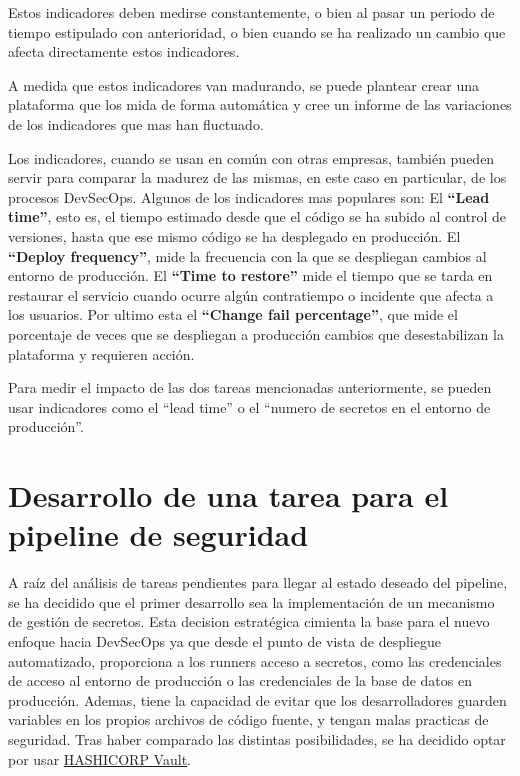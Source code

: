 \documentclass[12pt]{report} %
\begin{document}
Estos indicadores deben medirse constantemente, o bien al pasar un periodo de
tiempo estipulado con anterioridad, o bien cuando se ha realizado un cambio que
afecta directamente estos indicadores.

A medida que estos indicadores van madurando, se puede plantear crear una
plataforma que los mida de forma automática y cree un informe de las variaciones
de los indicadores que mas han fluctuado.

Los indicadores, cuando se usan en común con otras empresas, también pueden
servir para comparar la madurez de las mismas, en este caso en particular, de
los procesos \gls{DevSecOps}.
Algunos de los indicadores mas populares son:
El \textbf{``Lead time''}, esto es, el tiempo estimado desde que el código se ha subido
al control de versiones, hasta que ese mismo código se ha desplegado en
producción.
El \textbf{``Deploy frequency''}, mide la frecuencia con la que se despliegan
cambios al entorno de producción.
El \textbf{``Time to restore''} mide el tiempo que se tarda en restaurar el
servicio cuando ocurre algún contratiempo o incidente que afecta a los usuarios.
Por ultimo esta el \textbf{``Change fail percentage''}, que mide el porcentaje
de veces que se despliegan a producción cambios que desestabilizan la plataforma
y requieren acción.

Para medir el impacto de las dos tareas mencionadas anteriormente, se pueden
usar indicadores como el ``lead time'' o el ``numero de secretos en el entorno de
producción''.


\chapter{Desarrollo de una tarea para el pipeline de seguridad}

A raíz del análisis de tareas pendientes para llegar al estado deseado del
\gls{pipeline}, se ha decidido que el primer desarrollo sea la implementación de
un mecanismo de gestión de secretos.
Esta decision estratégica cimienta la base para el nuevo enfoque hacia
\gls{DevSecOps} ya que desde el punto de vista de despliegue automatizado,
proporciona a los \gls{runner}s acceso a secretos, como las credenciales de
acceso al entorno de producción o las credenciales de la base de datos en
producción.
Ademas, tiene la capacidad de evitar que los desarrolladores guarden variables
en los propios archivos de código fuente, y tengan malas practicas de seguridad.
Tras haber comparado las distintas posibilidades, se ha decidido optar por usar
\href{https://www.hashicorp.com/products/vault}{HASHICORP Vault}.
\end{document}
